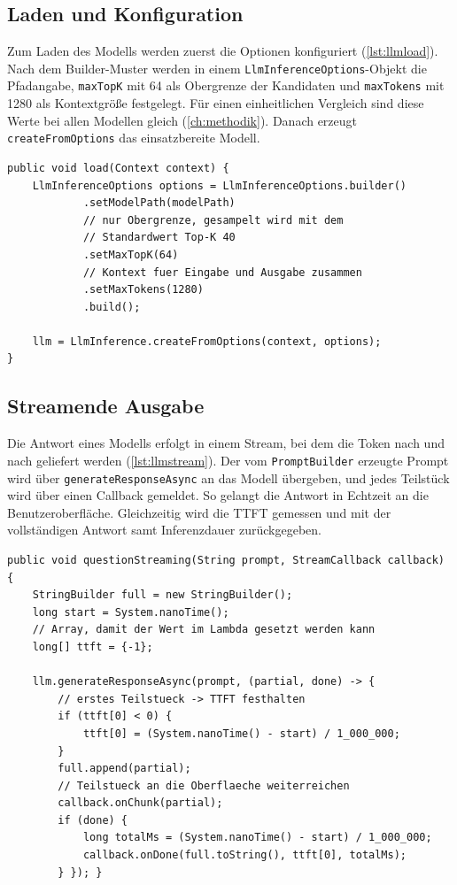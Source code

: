 \subsection{Laden und Konfiguration} Zum Laden des Modells werden zuerst die Optionen konfiguriert (\autoref{lst:llmload}). Nach dem Builder-Muster werden in einem \texttt{LlmInferenceOptions}-Objekt die Pfadangabe, \texttt{maxTopK} mit 64 als Obergrenze der Kandidaten und \texttt{maxTokens} mit 1280 als Kontextgröße festgelegt. Für einen einheitlichen Vergleich sind diese Werte bei allen Modellen gleich (\autoref{ch:methodik}). Danach erzeugt \texttt{createFromOptions} das einsatzbereite Modell.
\begin{lstlisting}[style=code, caption={[Laden des Modells]Laden und Konfigurieren des Modells. Kontextgröße und Sampling-Obergrenze sind für alle Modelle identisch gesetzt.}, label={lst:llmload}]
public void load(Context context) {
    LlmInferenceOptions options = LlmInferenceOptions.builder()
            .setModelPath(modelPath)
            // nur Obergrenze, gesampelt wird mit dem
            // Standardwert Top-K 40
            .setMaxTopK(64)
            // Kontext fuer Eingabe und Ausgabe zusammen
            .setMaxTokens(1280)
            .build();

    llm = LlmInference.createFromOptions(context, options);
}
\end{lstlisting}

\subsection{Streamende Ausgabe} Die Antwort eines Modells erfolgt in einem Stream, bei dem die Token nach und nach geliefert werden (\autoref{lst:llmstream}). Der vom \texttt{PromptBuilder} erzeugte Prompt wird über \texttt{generate\-Response\-Async} an das Modell übergeben, und jedes Teilstück wird über einen Callback gemeldet. So gelangt die Antwort in Echtzeit an die Benutzeroberfläche. Gleichzeitig wird die \ac{TTFT} gemessen und mit der vollständigen Antwort samt Inferenzdauer zurückgegeben.
\begin{lstlisting}[style=code, caption={[Streamende Ausgabe]Streamende Ausgabe mit Messung der Latenz. Beim ersten Teilstück wird die TTFT festgehalten, am Ende zusätzlich die Inferenzdauer.}, label={lst:llmstream}]
public void questionStreaming(String prompt, StreamCallback callback) {
    StringBuilder full = new StringBuilder();
    long start = System.nanoTime();
    // Array, damit der Wert im Lambda gesetzt werden kann
    long[] ttft = {-1};

    llm.generateResponseAsync(prompt, (partial, done) -> {
        // erstes Teilstueck -> TTFT festhalten
        if (ttft[0] < 0) {
            ttft[0] = (System.nanoTime() - start) / 1_000_000;
        }
        full.append(partial);
        // Teilstueck an die Oberflaeche weiterreichen
        callback.onChunk(partial);
        if (done) {
            long totalMs = (System.nanoTime() - start) / 1_000_000;
            callback.onDone(full.toString(), ttft[0], totalMs);
        } }); }
\end{lstlisting}

